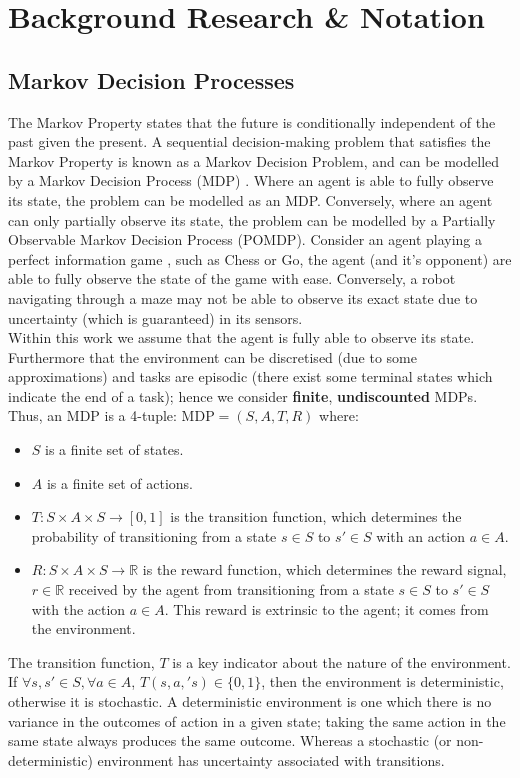 \chapter{Background Research \& Notation}
\label{chapter2}
\section{Markov Decision Processes}
The Markov Property states that the future is conditionally independent of the past given the present. A sequential decision-making problem that satisfies the Markov Property is known as a Markov Decision Problem, and can be modelled by a Markov Decision Process (MDP) \cite{10.5555/528623}. Where an agent is able to fully observe its state, the problem can be modelled as an MDP. Conversely, where an agent can only partially observe its state, the problem can be modelled by a Partially Observable Markov Decision Process (POMDP).
Consider an agent playing a perfect information game \cite{vonneumann.morgenstern47}, such as Chess or Go, the agent (and it's opponent) are able to fully observe the state of the game with ease. Conversely, a robot navigating through a maze may not be able to observe its exact state due to uncertainty (which is guaranteed) in its sensors.
\\Within this work we assume that the agent is fully able to observe its state. Furthermore that the environment can be discretised (due to some approximations) and tasks are episodic (there exist some terminal states which indicate the end of a task); hence we consider \textbf{finite}, \textbf{undiscounted} MDPs.
Thus, an MDP is a 4-tuple: $\text{MDP} = (S,A,T,R)$ where:
\begin{itemize}
    \item $S$ is a finite set of states.
    \item $A$ is a finite set of actions.
    \item $T : S \times A \times S \rightarrow [0,1]$ is the transition function, which determines the probability of transitioning from a state $s \in S$ to $s' \in S$ with an action $a \in A$.
    \item $R:S \times A \times S \rightarrow \mathbb{R}$ is the reward function, which determines the reward signal, $r \in \mathbb{R}$ received by the agent from transitioning from a state $s \in S$ to $s' \in S$ with the action $a \in A$. This reward is extrinsic to the agent; it comes from the environment.
\end{itemize}
The transition function, $T$ is a key indicator about the nature of the environment.
If $\forall s,s' \in S, \forall a \in A$, $T(s,a,'s) \in \{0,1\}$, then the environment is deterministic, otherwise it is stochastic.
A deterministic environment is one which there is no variance in the outcomes of action in a given state; taking the same action in the same state always produces the same outcome. Whereas a stochastic (or non-deterministic) environment has uncertainty associated with transitions.
